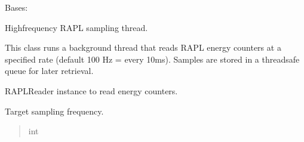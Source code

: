 \documentclass[letterpaper,10pt,english]{sphinxmanual}
\begin{document}
\begin{fulllineitems}
\label{\detokenize{core.utils.sampling:core.utils.sampling.HighFrequencySampler}}
\pysigstartsignatures
\pysiglinewithargsret
{}
{\sphinxparamcomma {}\sphinxparamcomma {}}
{}
\pysigstopsignatures
\sphinxAtStartPar
Bases: 

\sphinxAtStartPar
High\sphinxhyphen{}frequency RAPL sampling thread.

\sphinxAtStartPar
This class runs a background thread that reads RAPL energy counters at a
specified rate (default 100 Hz = every 10ms). Samples are stored in a
thread\sphinxhyphen{}safe queue for later retrieval.

\begin{fulllineitems}
\label{\detokenize{core.utils.sampling:core.utils.sampling.HighFrequencySampler.rapl_reader}}
\pysigstartsignatures
\pysigline
{}
\pysigstopsignatures
\sphinxAtStartPar
RAPLReader instance to read energy counters.

\end{fulllineitems}


\begin{fulllineitems}
\label{\detokenize{core.utils.sampling:core.utils.sampling.HighFrequencySampler.sampling_rate_hz}}
\pysigstartsignatures
\pysigline
{}
\pysigstopsignatures
\sphinxAtStartPar
Target sampling frequency.
\begin{quote}\begin{description}
\sphinxAtStartPar
int


\end{description}
\end{quote}
\end{fulllineitems}
\end{fulllineitems}
\end{document}
